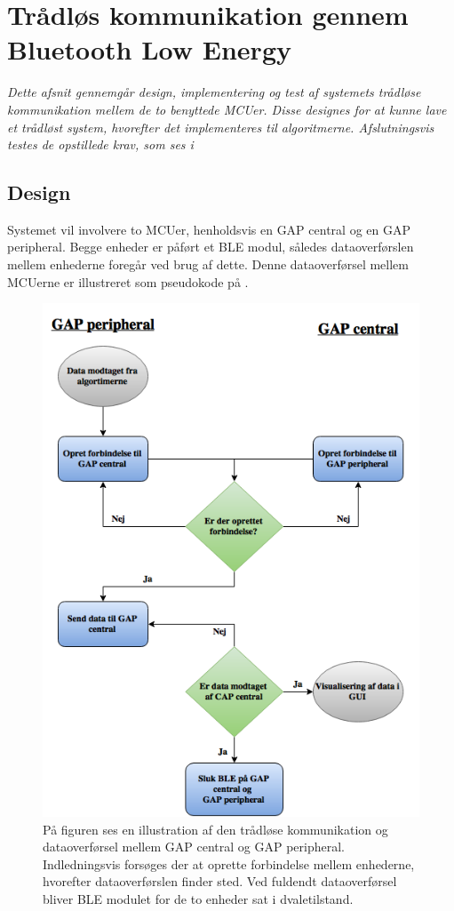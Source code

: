 \section{Trådløs kommunikation gennem Bluetooth Low Energy}
\textit{Dette afsnit gennemgår design, implementering og test af systemets trådløse kommunikation mellem de to benyttede MCUer. Disse designes for at kunne lave et trådløst system, hvorefter det implementeres til algoritmerne. Afslutningsvis testes de opstillede krav, som ses i }

\subsection{Design}
Systemet vil involvere to MCUer, henholdsvis en GAP central og en GAP peripheral. Begge enheder er påført et BLE modul, således dataoverførslen mellem enhederne foregår ved brug af dette. Denne dataoverførsel mellem MCUerne er illustreret som pseudokode på . 
\begin{figure}[H]
	\centering
	\includegraphics[scale=0.5]{figures/cDesign/blue_pseudo.png}
	\caption{På figuren ses en illustration af den trådløse kommunikation og dataoverførsel mellem GAP central og GAP peripheral. Indledningsvis forsøges der at oprette forbindelse mellem enhederne, hvorefter dataoverførslen finder sted. Ved fuldendt dataoverførsel bliver BLE modulet for de to enheder sat i dvaletilstand.}
	\label{fig:blue_pseudo}
\end{figure}
